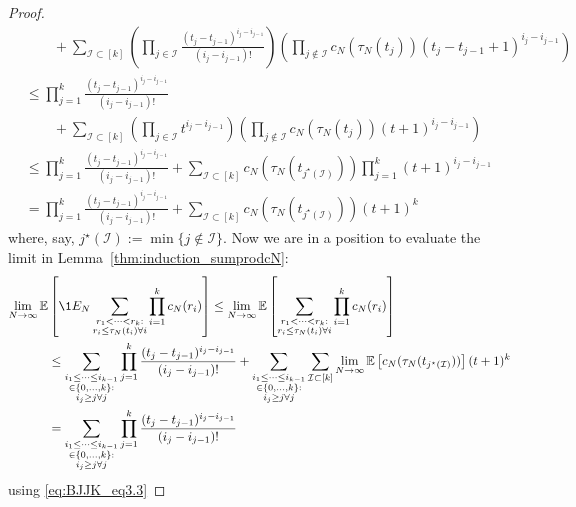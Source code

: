 \begin{proof}
\begin{align*}
    &\qquad+ \sum_{\mathcal{I} \subset [k]} \left( \prod_{j\in\mathcal{I}} 
        \frac{(t_j - t_{j-1})^{i_j - i_{j-1}}}{(i_j - i_{j-1})!}\right)
        \left( \prod_{j\notin\mathcal{I}} c_N(\tau_N(t_j)) 
        ( t_j - t_{j-1} +1 )^{i_j - i_{j-1}} \right) \\
&\leq \prod_{j=1}^k \frac{(t_j - t_{j-1})^{i_j - i_{j-1}}}{(i_j - i_{j-1})!}  \\
    &\qquad+ \sum_{\mathcal{I} \subset [k]} \left( \prod_{j\in\mathcal{I}} 
        t^{i_j - i_{j-1}}\right)
        \left( \prod_{j\notin\mathcal{I}} c_N(\tau_N(t_j)) 
        (t+1)^{i_j - i_{j-1}} \right) \\
&\leq \prod_{j=1}^k \frac{(t_j - t_{j-1})^{i_j - i_{j-1}}}{(i_j - i_{j-1})!}
        + \sum_{\mathcal{I} \subset [k]} c_N(\tau_N(t_{j^\star(\mathcal{I})})) 
        \prod_{j=1}^k ( t+1 )^{i_j - i_{j-1}} \\
&=  \prod_{j=1}^k \frac{(t_j - t_{j-1})^{i_j - i_{j-1}}}{(i_j - i_{j-1})!}
        + \sum_{\mathcal{I} \subset [k]} c_N(\tau_N(t_{j^\star(\mathcal{I})})) 
        ( t+1 )^k 
\end{align*}
where, say, $j^\star(\mathcal{I}) := \min\{ j\notin\mathcal{I}\}$.
Now we are in a position to evaluate the limit in Lemma~\ref{thm:induction_sumprodcN}:
\begin{align*}
\lim_{N\to\infty} \E &\left[ \1{E_N} 
        \sum_{\substack{r_1<\dots<r_k :\\ r_i\leq \tau_N(t_i) \forall i}} 
        \prod_{i=1}^k c_N(r_i) \right] 
\leq \lim_{N\to\infty} \E \left[\sum_{\substack{r_1<\dots<r_k :\\ 
        r_i\leq \tau_N(t_i) \forall i}} \prod_{i=1}^k c_N(r_i) \right] \\
&\leq \sum_{\substack{i_1\leq \dots\leq i_{k-1}\\ \in \{0,\dots,k\} :\\ 
        i_j \geq j \forall j}} \prod_{j=1}^k \frac{(t_j - t_{j-1})^{i_j - i_{j-1}}}
        {(i_j - i_{j-1})!}
        + \sum_{\substack{i_1\leq \dots\leq i_{k-1}\\ \in \{0,\dots,k\} 
        :\\ i_j \geq j \forall j}} \sum_{\mathcal{I} \subset [k]} \lim_{N\to\infty} 
        \E \left[ c_N(\tau_N(t_{j^\star(\mathcal{I})})) \right] 
        (t+1)^k \\
&= \sum_{\substack{i_1\leq \dots\leq i_{k-1}\\ \in \{0,\dots,k\} :\\ 
        i_j \geq j \forall j}} \prod_{j=1}^k \frac{(t_j - t_{j-1})^{i_j - i_{j-1}}}
        {(i_j - i_{j-1})!}
\end{align*}
using \eqref{eq:BJJK_eq3.3}


\end{proof}
